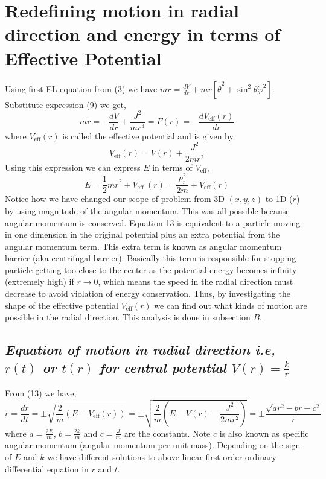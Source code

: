 \documentclass[conference]{IEEEtran}
\begin{document}
\section{\textbf{Redefining motion in radial direction and energy in terms of Effective Potential}}
 Using first EL equation from (3) we have $m\ddot{r} = \frac{dV}{d r} + mr\left[\dot{\theta}^{2}+\sin ^{2} \theta \dot{\varphi}^{2}\right]$. Substitute expression (9) we get, \begin{equation}m \ddot{r}= -\frac{d V}{d r}+\frac{J^{2}}{mr^{3}} = F(r) =  -\frac{d V_{\mathrm{eff}}(r)}{d r}\end{equation} where $V_{\mathrm{eff}}(r)$ is called the effective potential and is given by \begin{equation}V_{\mathrm{eff}}(r)=V(r)+\frac{J^{2}}{2 m r^{2}}\end{equation}Using this expression we can express $E$ in terms of $V_{\mathrm{eff}}$, \begin{equation}
     E=\frac{1}{2} m \dot{r}^{2}+V_{\text {eff }}(r) = \frac{p_{r}^{2}}{2m} + V_{\mathrm{eff}}(r)
 \end{equation}
 Notice how we have changed our scope of problem from 3D $(x,y,z)$ to 1D ($r$) by using magnitude of the angular momentum.  This was all possible because angular momentum is conserved. Equation 13 is equivalent to a particle moving in one dimension in the original potential plus an extra potential from the angular momentum term. This extra term is known as angular momentum barrier (aka centrifugal barrier). Basically this term is responsible for stopping particle getting too close to the center as the potential energy becomes infinity (extremely high) if $r \to 0$, which means the speed in the radial direction must decrease to avoid violation of energy conservation. Thus, by investigating the shape of the effective potential $V_{\mathrm{eff}}(r)$ we can find out what kinds of motion are possible in the radial direction. This analysis is done in subsection $B$.


 \subsection{\emph{\textbf{Equation of motion in radial direction i.e, $r(t)$ or $t(r)$ for central potential $V(r) = \frac{k}{r}$}}}
 From (13) we have, \begin{dmath}\dot{r}=\frac{d r}{d t}=\pm \sqrt{\frac{2}{m}\left(E-V_{\mathrm{eff}}(r)\right)}=\pm \sqrt{\frac{2}{m}\left(E-V(r)-\frac{J^{2}}{2 m r^{2}}\right)} = \pm\frac{\sqrt{ar^{2} - br - c^{2}}}{r}\end{dmath} where $a = \frac{2E}{m}$, $b = \frac{2k}{m}$ and $c = \frac{J}{m}$ are the constants. Note $c$ is also known as specific angular momentum (angular momentum per unit mass). Depending on the sign of $E$ and $k$ we have different solutions to above linear first order ordinary differential equation in $r$ and $t$. 
 
\end{document}
